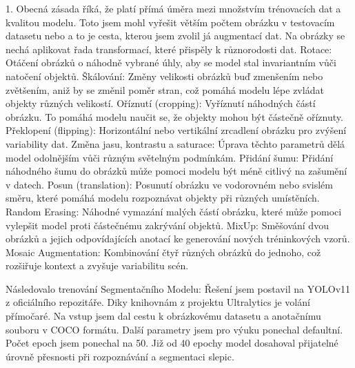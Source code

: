 1.	Obecná zásada říká, že platí přímá úměra mezi množstvím trénovacích dat a kvalitou modelu.
Toto jsem mohl vyřešit větším počtem obrázku v testovacím datasetu nebo a to je cesta, kterou jsem zvolil já augmentací dat.
Na obrázky se nechá aplikovat řada transformací, které přispěly k různorodosti dat.\newline
\newline
Rotace: Otáčení obrázků o náhodně vybrané úhly, aby se model stal invariantním vůči natočení objektů.\newline
Škálování: Změny velikosti obrázků buď zmenšením nebo zvětšením, aniž by se změnil poměr stran, což pomáhá modelu lépe zvládat objekty různých velikostí.\newline
Oříznutí (cropping): Vyříznutí náhodných částí obrázku. \newline
To pomáhá modelu naučit se, že objekty mohou být částečně oříznuty.\newline
Překlopení (flipping): Horizontální nebo vertikální zrcadlení obrázku pro zvýšení variability dat.\newline
Změna jasu, kontrastu a saturace: Úprava těchto parametrů dělá model odolnějším vůči různým světelným podmínkám.\newline
Přidání šumu: Přidání náhodného šumu do obrázků může pomoci modelu být méně citlivý na zašumění v datech.\newline
Posun (translation): Posunutí obrázku ve vodorovném nebo svislém směru, které pomáhá modelu rozpoznávat objekty při různých umístěních.\newline
Random Erasing: Náhodné vymazání malých částí obrázku, které může pomoci vylepšit model proti částečnému zakrývání objektů.\newline
MixUp: Směšování dvou obrázků a jejich odpovídajících anotací ke generování nových tréninkových vzorů.\newline
Mosaic Augmentation: Kombinování čtyř různých obrázků do jednoho, což rozšiřuje kontext a zvyšuje variabilitu scén.\newline
\newline

Následovalo trenování Segmentačního Modelu:
Řešení jsem postavil na YOLOv11 z oficiálního repozitáře.
Diky knihovnám z projektu Ultralytics je volání přímočaré.
Na vstup jsem dal cestu k obrázkovému datasetu a anotačnímu souboru v COCO formátu.
Další parametry jsem pro výuku ponechal defaultní.
Počet epoch jsem ponechal na 50.
Již od 40 epochy model dosahoval přijatelné úrovně přesnosti při rozpoznávání a segmentaci slepic.

